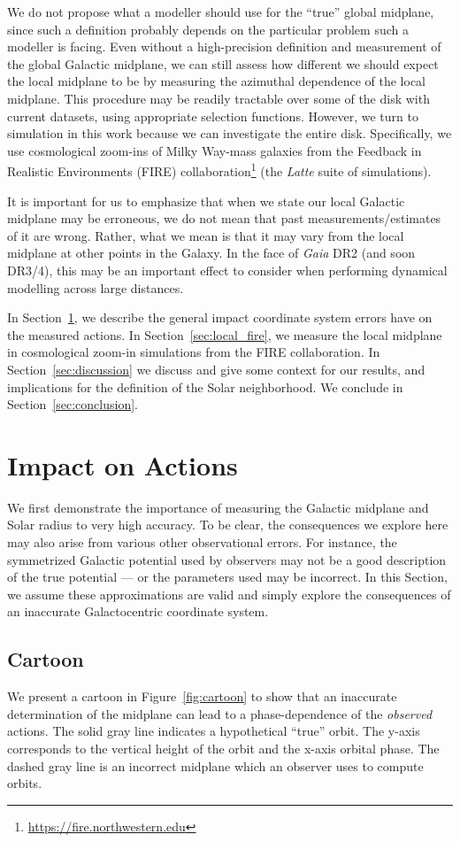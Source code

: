 \documentclass[twocolumn]{aastex62}
\begin{document}
We do not propose what a modeller should use for the ``true'' global midplane,
since such a definition probably depends on the particular problem such a
modeller is facing. Even without a high-precision definition and measurement
of the global Galactic midplane, we can still assess how different we should
expect the local midplane to be by measuring the azimuthal dependence of the
local midplane. This procedure may be readily tractable over some of the disk
with current datasets, using appropriate selection functions. However, we turn
to simulation in this work because we can investigate the entire disk.
Specifically, we use cosmological zoom-ins of Milky Way-mass galaxies from the
Feedback in Realistic Environments (FIRE)
collaboration\footnote{\url{https://fire.northwestern.edu}} (the {\em Latte}
suite of simulations).

It is important for us to emphasize that when we state our local Galactic
midplane may be erroneous, we do not mean that past measurements/estimates of
it are wrong. Rather, what we mean is that it may vary from the local midplane
at other points in the Galaxy. In the face of {\em Gaia} DR2 (and soon DR3/4),
this may be an important effect to consider when performing dynamical
modelling across large distances.

In Section~\ref{sec:ref_frame}, we describe the general impact coordinate
system errors have on the measured actions. In Section~\ref{sec:local_fire},
we measure the local midplane in cosmological zoom-in simulations from the
FIRE collaboration. In Section~\ref{sec:discussion} we discuss and give some
context for our results, and implications for the definition of the Solar
neighborhood. We conclude in Section~\ref{sec:conclusion}.

\section{Impact on Actions} \label{sec:ref_frame}
We first demonstrate the importance of measuring the Galactic midplane and
Solar radius to very high accuracy. To be clear, the consequences we explore
here may also arise from various other observational errors. For instance, the
symmetrized Galactic potential used by observers may not be a good description
of the true potential --- or the parameters used may be incorrect. In this
Section, we assume these approximations are valid and simply explore the
consequences of an inaccurate Galactocentric coordinate system.

\subsection{Cartoon} \label{ssec:cartoon}
We present a cartoon in Figure~\ref{fig:cartoon} to show that an inaccurate
determination of the midplane can lead to a phase-dependence of the {\em
observed} actions. The solid gray line indicates a hypothetical ``true''
orbit. The y-axis corresponds to the vertical height of the orbit and the
x-axis orbital phase. The dashed gray line is an incorrect midplane which an
observer uses to compute orbits.
\end{document}
